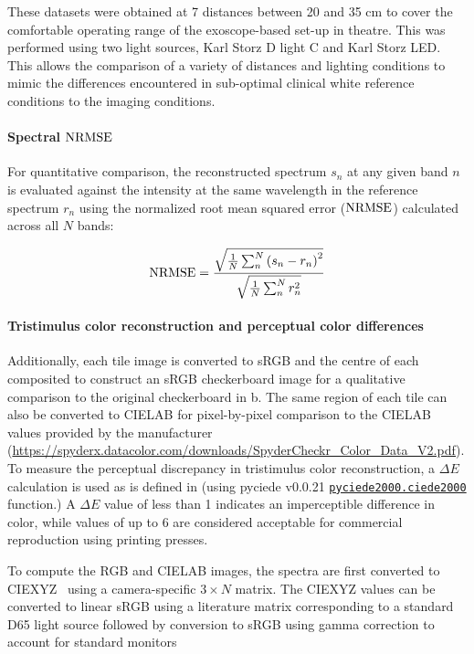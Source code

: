 These datasets were obtained at 7 distances between 20 and 35 cm to cover the comfortable operating range of the exoscope-based set-up in theatre. This was performed using two light sources, Karl Storz D light C and Karl Storz LED. This allows the comparison of a variety of distances and lighting conditions to mimic the differences encountered in sub-optimal clinical white reference conditions to the imaging conditions.

%

\paragraph{Spectral $\operatorname{NRMSE}$}
For quantitative comparison, the reconstructed spectrum $s_n$ at any given band $n$ is evaluated against the intensity at the same wavelength in the reference spectrum $r_n$ using the normalized root mean squared error ($\operatorname{NRMSE}$) calculated across all $N$ bands:
%
\begin{linenomath*}
\begin{equation}
    \operatorname{NRMSE} = \frac{\sqrt{\frac{1}{N}\sum_n^N\left(s_n - r_n\right)^2}}{\sqrt{\frac{1}{N}\sum_n^N r^2_n}}
\label{eq:normRMSE}
\end{equation}
\end{linenomath*}

\paragraph{Tristimulus color reconstruction and perceptual color differences}
Additionally, each tile image is converted to sRGB and the centre of each composited to construct an sRGB checkerboard image for a qualitative comparison to the original checkerboard in b. The same region of each tile can also be converted to CIELAB for pixel-by-pixel comparison to the CIELAB values provided by the manufacturer (\url{https://spyderx.datacolor.com/downloads/SpyderCheckr_Color_Data_V2.pdf}).
%
To measure the perceptual discrepancy in tristimulus color reconstruction, a $\Delta E$ calculation
%
is used as is defined in \citet{Sharma2005}
(using pyciede v0.0.21 \newline \href{https://pypi.org/project/pyciede2000/}{ \texttt{pyciede2000.ciede2000}} function.) A $\Delta E$ value of less than 1 indicates an imperceptible difference in color, while values of up to 6 are considered acceptable for commercial reproduction using printing presses. 
% 
% 
%  
%    
% 
% 
% 

To compute the RGB and CIELAB images, the spectra are first converted to CIEXYZ~\citep{Smith1931} using a camera-specific $3 \times N$ matrix.
%
%
%
%  
%
%
%
The CIEXYZ values can be converted to linear sRGB using a literature matrix corresponding to a standard D65 light source
%
followed by conversion to sRGB using gamma correction to account for standard monitors~\citep{Magnusson2020,Reinhard}
% 
% 
% 
%
%
%
%
%
% 
% 
% 
% 
% 
% 
%

